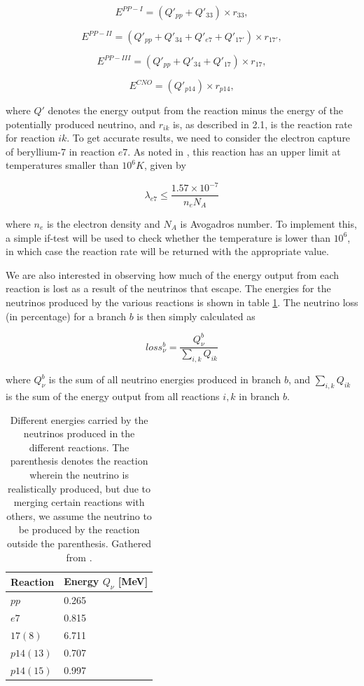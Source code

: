 \documentclass[a4paper,10pt,english]{article}
\begin{document}
$$E^{PP-I} = (Q'_{pp} + Q'_{33}) \times r_{33},$$

$$E^{PP-II} = (Q'_{pp} + Q'_{34} + Q'_{e7} + Q'_{17'}) \times r_{17'},$$

$$E^{PP-III} = (Q'_{pp} + Q'_{34} + Q'_{17}) \times r_{17},$$

$$E^{CNO} = (Q'_{p14}) \times r_{p14},$$

where $Q'$ denotes the energy output from the reaction minus the energy of the potentially produced neutrino, and $r_{ik}$ is, as described in 2.1, is the reaction rate for reaction $ik$. To get accurate results, we need to consider the electron capture of beryllium-7 in reaction $e7$. As noted in \cite{Caughlan1988}, this reaction has an upper limit at temperatures smaller than $10^6 K$, given by

$$\lambda_{e7} \leq \frac{1.57\times 10^{-7}}{n_e N_A}$$

where $n_e$ is the electron density and $N_A$ is Avogadros number. To implement this, a simple if-test will be used to check whether the temperature is lower than $10^6$, in which case the reaction rate will be returned with the appropriate value.

We are also interested in observing how much of the energy output from each reaction is lost as a result of the neutrinos that escape. The energies for the neutrinos produced by the various reactions is shown in table \ref{tab:neutrino}. The neutrino loss (in percentage) for a branch $b$ is then simply calculated as

$$loss^b_\nu = \frac{Q^b_{\nu}}{\sum_{i,k} Q_{ik}}$$

where $Q^b_\nu$ is the sum of all neutrino energies produced in branch $b$, and $\sum_{i,k} Q_{ik}$ is the sum of the energy output from all reactions $i,k$ in branch $b$.

\begin{table}[]\centering
\begin{tabular}{ll}
Reaction  & Energy $Q_\nu$ {[}MeV{]} \\ \hline
$pp$      & 0.265                    \\
$e7$      & 0.815                    \\
$17(8)$   & 6.711                    \\
$p14(13)$ & 0.707                    \\
$p14(15)$ & 0.997                    \\ \hline
\end{tabular}
\caption{Different energies carried by the neutrinos produced in the different reactions. The parenthesis denotes the reaction wherein the neutrino is realistically produced, but due to merging certain reactions with others, we assume the neutrino to be produced by the reaction outside the parenthesis. Gathered from \cite{Gudiksen2015}.}
\label{tab:neutrino}
\end{table}
\end{document}
